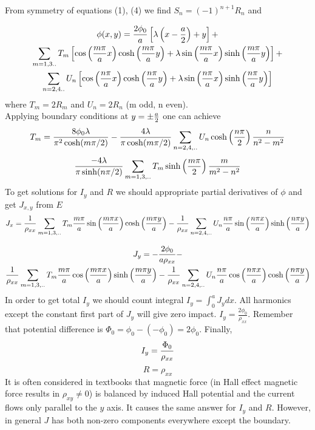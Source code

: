 \documentclass[a4paper]{article}
\begin{document}
From symmetry of equations (1), (4)  we find $S_n = (-1)^{n+1} R_n$ and 

\begin{multline}
\phi(x,y) = {2 \phi_0 \over a} \left[ \lambda \left( x - {a \over 2}   \right) + y \right] + \\
\sum_{m = 1,3..} T_m \left[ \cos \left( {m \pi \over a} x \right) \cosh \left( {m \pi \over a } y \right) + \lambda \sin \left( {m \pi \over a  } x \right) \sinh \left(  { m \pi \over a } y \right) \right] + \\
\sum_{n = 2,4..} U_n \left[ \cos \left( {n \pi \over a} x \right) \cosh \left( {n \pi \over a } y \right) + \lambda \sin \left( {n \pi \over a  } x\right) \sinh \left(  { n \pi \over a } y \right) \right]
\end{multline}
where $T_m = 2 R_m$ and $U_n = 2 R_n$ (m odd, n even).
\\
Applying boundary conditions at $y = \pm {a \over 2}$ one can achieve 
\begin{equation}
T_m = \frac{8 \phi_0 \lambda}{\pi^2 \cosh (m \pi /2)} - \frac{4 \lambda}{\pi \cosh (m \pi /2)} \sum_{n = 2,4, ..} U_n \cosh \left( {n \pi \over 2} \right) \frac{n}{n^2 - m^2}
\end{equation}
\begin{equation}
\frac{-4 \lambda}{\pi \sinh (n \pi / 2)} \sum_{m = 1,3,..} T_m \sinh \left( {m \pi \over 2} \right) \frac{m}{m^2-n^2}
\end{equation}
To get solutions for $I_y$ and $R$ we should appropriate partial derivatives of $\phi$ and get $J_{x,y}$ from $E$
\begin{equation}
J_x = {1 \over \rho_{xx}} \sum_{m = 1,3,..} T_m {m \pi \over a} \sin \left( m \pi x \over a \right) \cosh \left( m \pi y \over a \right) - 
{1 \over \rho_{xx}} \sum_{n = 2,4,..} U_n {n \pi \over a} \sin \left( n \pi x \over a \right) \sinh \left( n \pi y \over a \right)
\end{equation}

\begin{multline}
J_y = -\frac{2 \phi_0}{a \rho_{xx}} - \\
{1 \over \rho_{xx}} \sum_{m = 1,3,..} T_m {m \pi \over a} \cos \left( m \pi x \over a \right) \sinh \left( m \pi y \over a \right) - 
{1 \over \rho_{xx}} \sum_{n = 2,4,..} U_n {n \pi \over a} \cos \left( n \pi x \over a \right) \cosh \left( n \pi y \over a \right)
\end{multline}
In order to get total $I_y$ we should count integral $I_y = \int_0^a J_y dx$. All harmonics except the constant first part of $J_y$ will give zero impact. $I_y = \frac{2 \phi_0}{\rho_{xx}}$.  Remember that potential difference is $\Phi_0 = \phi_0 - (-\phi_0) = 2 \phi_0$. Finally, 
\begin{equation}
I_y = {\Phi_0 \over \rho_{xx}}
\end{equation}
\begin{equation}
R = \rho_{xx}
\end{equation}
It is often considered in textbooks that magnetic force (in Hall effect magnetic force results in $\rho_{xy} \neq 0$) is balanced by induced Hall potential and the current flows only parallel to the $y$ axis. It causes the same answer for $I_y$ and $R$. However, in general $J$ has both non-zero components everywhere except the boundary.  
\end{document}
